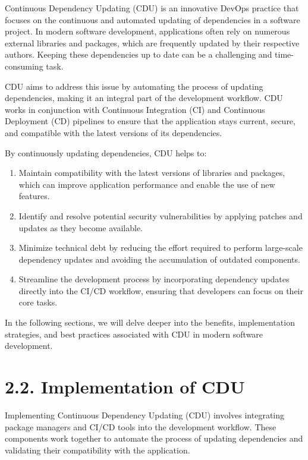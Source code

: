 \documentclass[10pt]{article}
\begin{document}
Continuous Dependency Updating (CDU) is an innovative DevOps practice that focuses on the continuous and automated updating of dependencies in a software project. In modern software development, applications often rely on numerous external libraries and packages, which are frequently updated by their respective authors. Keeping these dependencies up to date can be a challenging and time-consuming task.

CDU aims to address this issue by automating the process of updating dependencies, making it an integral part of the development workflow. CDU works in conjunction with Continuous Integration (CI) and Continuous Deployment (CD) pipelines to ensure that the application stays current, secure, and compatible with the latest versions of its dependencies.

By continuously updating dependencies, CDU helps to:

\begin{enumerate}

  \item Maintain compatibility with the latest versions of libraries and packages, which can improve application performance and enable the use of new features.

  \item Identify and resolve potential security vulnerabilities by applying patches and updates as they become available.

  \item Minimize technical debt by reducing the effort required to perform large-scale dependency updates and avoiding the accumulation of outdated components.

  \item Streamline the development process by incorporating dependency updates directly into the CI/CD workflow, ensuring that developers can focus on their core tasks.

\end{enumerate}

In the following sections, we will delve deeper into the benefits, implementation strategies, and best practices associated with CDU in modern software development.

\section*{2.2. Implementation of CDU}

Implementing Continuous Dependency Updating (CDU) involves integrating package managers and CI/CD tools into the development workflow. These components work together to automate the process of updating dependencies and validating their compatibility with the application.
\end{document}
